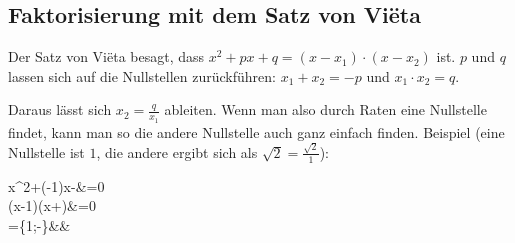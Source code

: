 \documentclass[12pt]{article}
\begin{document}
	\subsection{Faktorisierung mit dem Satz von Viëta}
		\begin{tcolorbox}[boxsep=0pt,top=.75cm,left=1cm,right=1cm, bottom=.75cm,arc=0pt,auto outer arc,colback=white,colframe=black, enlarge top by=.25cm, enlarge bottom by=.25cm]
		Der Satz von Viëta besagt, dass $x^2+px+q=(x-x_1)\cdot(x-x_2)$ ist. $p$ und $q$ lassen sich auf die Nullstellen zurückführen: $x_1+x_2=-p$ und $x_1\cdot x_2 = q$.
		\end{tcolorbox}
		\noindent Daraus lässt sich $x_2=\frac{q}{x_1}$ ableiten. Wenn man also durch Raten eine Nullstelle findet, kann man so die andere Nullstelle auch ganz einfach finden.\newline\newline
		Beispiel (eine Nullstelle ist $1$, die andere ergibt sich als $\sqrt{2} = \frac{\sqrt{2}}{1}$):
		\begin{flalign*}
			x^2+(\sqrt{2}-1)x-&=0\\
			(x-1)\cdot (x+)&=0\\
			=\{1;-\}&&
		\end{flalign*}
\end{document}
